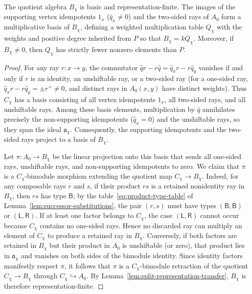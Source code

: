 \begin{lemma}
\label{lem:centralizer-ray-algebra}
The quotient algebra $B_\chi$ is basic and representation-finite. The images of the supporting vertex idempotents $1_x$ ($\widehat q_x\ne0$) and the two-sided rays of $A_0$ form a multiplicative basis of $B_\chi$, defining a weighted multiplication table $Q_\chi$ with the weights and positive degree inherited from $P$ so that $B_\chi=kQ_\chi$. Moreover, if $B_\chi\ne0$, then $Q_\chi$ has strictly fewer nonzero elements than $P$.
\end{lemma}
\begin{proof}
For any ray $r\colon x\to y$, the commutator $\widehat q r-r\widehat q=\widehat q_xr-r\widehat q_y$ vanishes if and only if $r$ is an identity, an unshiftable ray, or a two-sided ray (for a one-sided ray, $\widehat q_xr-r\widehat q_y=\pm r^+\ne0$, and distinct rays in $A_0(x,y)$ have distinct weights). Thus $C_\chi$ has a basis consisting of all vertex idempotents $1_x$, all two-sided rays, and all unshiftable rays. Among these basis elements, multiplication by $\widehat q$ annihilates precisely the non-supporting idempotents ($\widehat q_x=0$) and the unshiftable rays, so they span the ideal $\mathfrak a_\chi$. Consequently, the supporting idempotents and the two-sided rays project to a basis of $B_\chi$.

Let $\pi\colon A_0\to B_\chi$ be the linear projection onto this basis that sends all one-sided rays, unshiftable rays, and non-supporting idempotents to zero. We claim that $\pi$ is a $C_\chi$-bimodule morphism extending the quotient map $C_\chi\to B_\chi$. Indeed, for any composable rays $r$ and $s$, if their product $rs$ is a retained nonidentity ray in $B_\chi$, then $rs$ has type $\mathsf B$; by the table~\eqref{eq:product-type-table} of Lemma~\ref{lem:successor-substitutions}, the pair $(r,s)$ must have types $(\mathsf B,\mathsf B)$ or $(\mathsf L,\mathsf R)$. If at least one factor belongs to $C_\chi$, the case $(\mathsf L,\mathsf R)$ cannot occur because $C_\chi$ contains no one-sided rays. Hence no discarded ray can multiply an element of $C_\chi$ to produce a retained ray in $B_\chi$. Conversely, if both factors are retained in $B_\chi$ but their product in $A_0$ is unshiftable (or zero), that product lies in $\mathfrak a_\chi$ and vanishes on both sides of the bimodule identity. Since identity factors manifestly respect $\pi$, it follows that $\pi$ is a $C_\chi$-bimodule retraction of the quotient $C_\chi\to B_\chi$ through $C_\chi\hookrightarrow A_0$. By Lemma~\ref{lem:split-representation-transfer}, $B_\chi$ is therefore representation-finite.


\end{proof}
